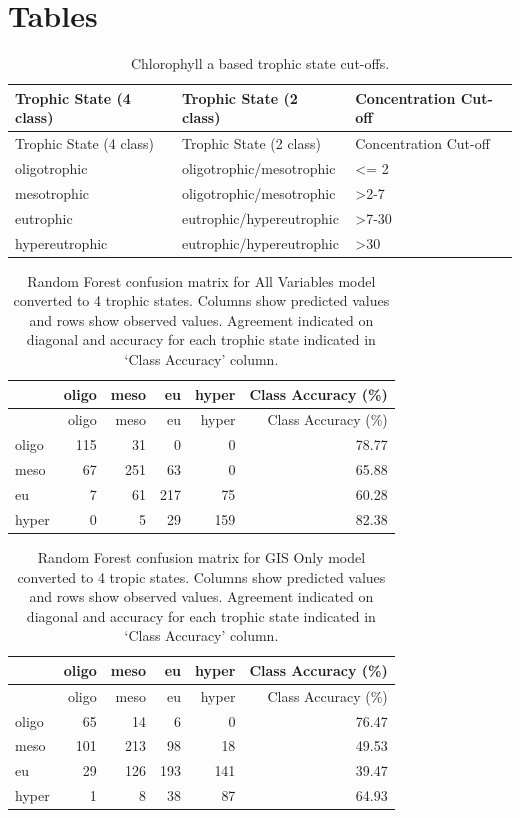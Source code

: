 \documentclass[11pt,]{article}
\begin{document}
\newpage

\newpage

\section{Tables}\label{tables}

\begin{longtable}[c]{@{}lll@{}}
\caption{Chlorophyll a based trophic state cut-offs.
\label{tab:trophicStateTable}}\tabularnewline
\toprule
Trophic State (4 class) & Trophic State (2 class) & Concentration
Cut-off\tabularnewline
\midrule
\endfirsthead
\toprule
Trophic State (4 class) & Trophic State (2 class) & Concentration
Cut-off\tabularnewline
\midrule
\endhead
oligotrophic & oligotrophic/mesotrophic & \textless{}= 2\tabularnewline
mesotrophic & oligotrophic/mesotrophic &
\textgreater{}2-7\tabularnewline
eutrophic & eutrophic/hypereutrophic & \textgreater{}7-30\tabularnewline
hypereutrophic & eutrophic/hypereutrophic &
\textgreater{}30\tabularnewline
\bottomrule
\end{longtable}

\newpage

\begin{longtable}[c]{@{}lrrrrr@{}}
\caption{Random Forest confusion matrix for All Variables model
converted to 4 trophic states. Columns show predicted values and rows
show observed values. Agreement indicated on diagonal and accuracy for
each trophic state indicated in `Class Accuracy' column.
\label{tab:Confusion_All_4}}\tabularnewline
\toprule
& oligo & meso & eu & hyper & Class Accuracy (\%)\tabularnewline
\midrule
\endfirsthead
\toprule
& oligo & meso & eu & hyper & Class Accuracy (\%)\tabularnewline
\midrule
\endhead
oligo & 115 & 31 & 0 & 0 & 78.77\tabularnewline
meso & 67 & 251 & 63 & 0 & 65.88\tabularnewline
eu & 7 & 61 & 217 & 75 & 60.28\tabularnewline
hyper & 0 & 5 & 29 & 159 & 82.38\tabularnewline
\bottomrule
\end{longtable}

\newpage

\begin{longtable}[c]{@{}lrrrrr@{}}
\caption{Random Forest confusion matrix for GIS Only model converted to
4 tropic states. Columns show predicted values and rows show observed
values. Agreement indicated on diagonal and accuracy for each trophic
state indicated in `Class Accuracy' column.
\label{tab:Confusion_GIS_4}}\tabularnewline
\toprule
& oligo & meso & eu & hyper & Class Accuracy (\%)\tabularnewline
\midrule
\endfirsthead
\toprule
& oligo & meso & eu & hyper & Class Accuracy (\%)\tabularnewline
\midrule
\endhead
oligo & 65 & 14 & 6 & 0 & 76.47\tabularnewline
meso & 101 & 213 & 98 & 18 & 49.53\tabularnewline
eu & 29 & 126 & 193 & 141 & 39.47\tabularnewline
hyper & 1 & 8 & 38 & 87 & 64.93\tabularnewline
\bottomrule
\end{longtable}
\end{document}
